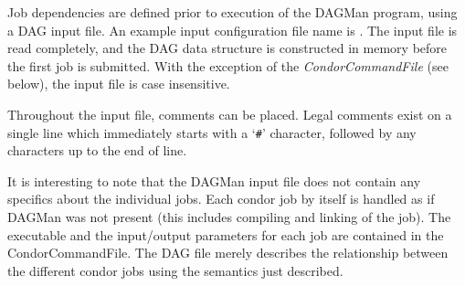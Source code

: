 Job dependencies are defined prior to execution of the DAGMan program, using a
DAG input file.  An example input configuration file name is
.  The input file is read completely, and the DAG data
structure is constructed in memory before the first job is submitted.  With
the exception of the \textit{CondorCommandFile} (see below), the input file is
case insensitive.

Throughout the input file, comments can be placed.  
\Note Legal comments exist on a single line which immediately starts
with a `\texttt{\#}' character, followed by any characters up to the
end of line.

It is interesting to note that the DAGMan input file does not contain any
specifics about the individual jobs. Each condor job by itself is handled as
if DAGMan was not present (this includes compiling and linking of the
job). The executable and the input/output parameters for each job are
contained in the CondorCommandFile.  The DAG file merely describes the
relationship between the different condor jobs using the semantics just
described.


